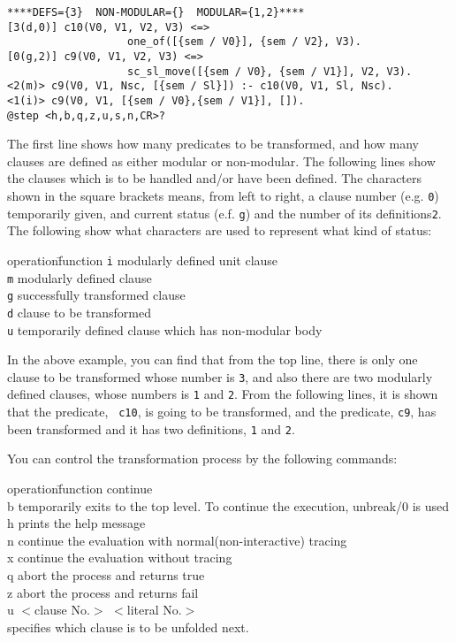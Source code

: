 \begin{verbatim}
****DEFS={3}  NON-MODULAR={}  MODULAR={1,2}****
[3(d,0)] c10(V0, V1, V2, V3) <=>
                   one_of([{sem / V0}], {sem / V2}, V3).
[0(g,2)] c9(V0, V1, V2, V3) <=>
                   sc_sl_move([{sem / V0}, {sem / V1}], V2, V3).
<2(m)> c9(V0, V1, Nsc, [{sem / Sl}]) :- c10(V0, V1, Sl, Nsc).
<1(i)> c9(V0, V1, [{sem / V0},{sem / V1}], []).
@step <h,b,q,z,u,s,n,CR>?  
\end{verbatim}

The first line shows how many predicates to be transformed, and how
many clauses are defined as either modular or non-modular.  The
following lines show the clauses which is to be handled and/or have been
defined. The characters shown in the square brackets means, from left to
right, a clause number (e.g. {\tt 0}) temporarily given, and current
status (e.f. {\tt g}) and the number of its definitions{\tt 2}.  The
following show what characters are used to represent what kind of status:

\begin{tabbing}
operation\=function \kill
{\tt i} \> modularly defined unit clause\\
{\tt m} \> modularly defined clause\\
{\tt g} \> successfully transformed clause\\
{\tt d} \> clause to be transformed\\
{\tt u} \> temporarily defined clause which has non-modular body\\
\end{tabbing}

  In the above example, you can find that from the top line, there is
only one clause to be transformed whose number is {\tt 3}, and also
there are two modularly defined clauses,  whose numbers is {\tt 1} and
{\tt 2}. From the following lines, it is shown that the predicate, {\tt
c10}, is going to be transformed, and the predicate, {\tt c9}, has been
transformed and it has two definitions, {\tt 1} and {\tt 2}.

You can control the transformation process by the
following commands:
\begin{tabbing}
operation\=function \kill
[CR] \> continue\\
b \> temporarily exits to the top level. To continue the execution, unbreak/0 is used\\
h \> prints the help message\\
n \> continue the evaluation with normal(non-interactive) tracing\\
x \> continue the evaluation without tracing\\
q \> abort the process and returns true\\
z \> abort the process and returns fail\\
u $<$clause No.$>$  $<$literal No.$>$ \\
        \> specifies which clause is to be unfolded next.
\end{tabbing}

